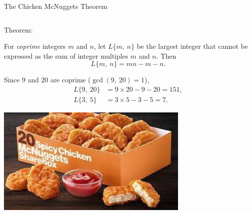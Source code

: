 \documentclass[9pt,aspectratio=169]{beamer}
\begin{document}
\begin{frame}{The Chicken McNuggets Theorem}
\begin{columns}[T]
\begin{column}{0.5\textwidth}
      {\color{textBlue} Theorem:}
      \begin{definition}
        For \emph{coprime} integers $m$ and $n$, let $L\{m,\ n\}$ be the largest integer that cannot be expressed as the sum of integer multiples $m$ and $n$. Then
        \[ L\{m,\ n\} = mn − m − n. \]
        \vspace*{-1\baselineskip}
      \end{definition}
      Since $9$ and $20$ are coprime ($\gcd(9,\ 20) = 1$),
      \begin{align*}
        L\{9,\ 20\} &= 9 \times 20 - 9 - 20 = 151, \\
        L\{3,\ 5\} &= 3 \times 5 - 3 - 5 = 7.
      \end{align*}
      \begin{center}
        \vspace*{-1\baselineskip}
        \includegraphics[width=0.7\textwidth]{04 - Number Theory 101/mcnuggets.png}
      \end{center}
    \end{column}
  \end{columns}
\end{frame}
\end{document}
